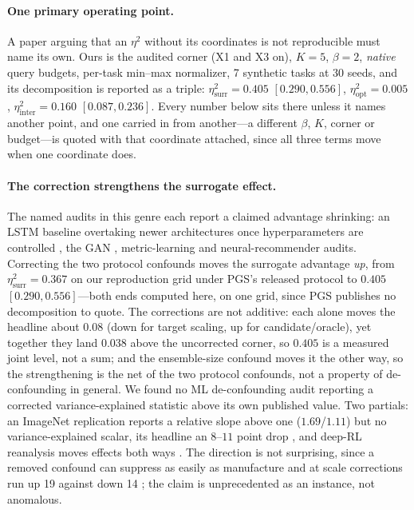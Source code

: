 \documentclass[letterpaper]{article} %
\theoremstyle{plain}
\newcommand{\mdemph}[1]{\emph{#1}}
\begin{document}
\paragraph{One primary operating point.} A paper arguing that an $\eta^2$ without its coordinates is not reproducible must name its own. Ours is the audited corner (X1 and X3 on), $K{=}5$, $\beta{=}2$, \mdemph{native} query budgets, per-task min--max normalizer, 7 synthetic tasks at 30 seeds, and its decomposition is reported as a triple: $\eta^2_{\text{surr}}{=}0.405$ $[0.290,0.556]$, $\eta^2_{\text{opt}}{=}0.005$, $\eta^2_{\text{inter}}{=}0.160$ $[0.087,0.236]$. Every number below sits there unless it names another point, and one carried in from another---a different $\beta$, $K$, corner or budget---is quoted with that coordinate attached, since all three terms move when one coordinate does.

\paragraph{The correction strengthens the surrogate effect.} The named audits in this genre each report a claimed advantage shrinking: an LSTM baseline overtaking newer architectures once hyperparameters are controlled \citep{melis2018sota}, the GAN \citep{lucic2018gansequal}, metric-learning \citep{musgrave2020realitycheck} and neural-recommender \citep{ferraridacrema2019worrying} audits. Correcting the two protocol confounds moves the surrogate advantage \mdemph{up}, from $\eta^2_{\text{surr}}{=}0.367$ on our reproduction grid under PGS's released protocol \citep{chemingui2024pggs} to $0.405$ $[0.290,0.556]$---both ends computed here, on one grid, since PGS publishes no decomposition to quote. The corrections are not additive: each alone moves the headline about $0.08$ (down for target scaling, up for candidate/oracle), yet together they land $0.038$ above the uncorrected corner, so $0.405$ is a measured joint level, not a sum; and the ensemble-size confound moves it the other way, so the strengthening is the net of the two protocol confounds, not a property of de-confounding in general. We found no ML de-confounding audit reporting a corrected variance-explained statistic above its own published value. Two partials: an ImageNet replication reports a relative slope above one ($1.69$/$1.11$) but no variance-explained scalar, its headline an $8$--$11$ point drop \citep{recht2019imagenet}, and deep-RL reanalysis moves effects both ways \citep{agarwal2021precipice}. The direction is not surprising, since a removed confound can suppress as easily as manufacture \citep{bressan2019confounds} and at scale corrections run up 19 against down 14 \citep{maassen2020reproducibility}; the claim is unprecedented as an instance, not anomalous.
\end{document}
